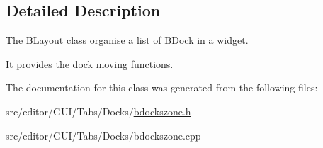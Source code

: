 \subsection{\-Detailed \-Description}
\-The \hyperlink{class_b_layout}{\-B\-Layout} class organise a list of \hyperlink{class_b_dock}{\-B\-Dock} in a widget. 

\-It provides the dock moving functions. 

\-The documentation for this class was generated from the following files\-:\begin{DoxyCompactItemize}
\item 
src/editor/\-G\-U\-I/\-Tabs/\-Docks/\hyperlink{bdockszone_8h}{bdockszone.\-h}\item 
src/editor/\-G\-U\-I/\-Tabs/\-Docks/bdockszone.\-cpp\end{DoxyCompactItemize}
